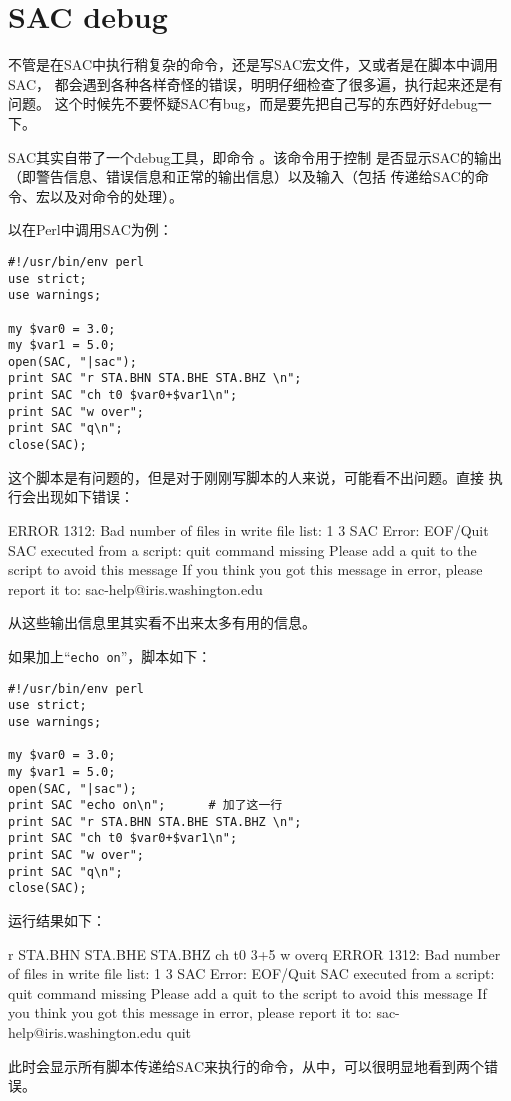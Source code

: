 \section{SAC debug}
不管是在SAC中执行稍复杂的命令，还是写SAC宏文件，又或者是在脚本中调用SAC，
都会遇到各种各样奇怪的错误，明明仔细检查了很多遍，执行起来还是有问题。
这个时候先不要怀疑SAC有bug，而是要先把自己写的东西好好debug一下。

SAC其实自带了一个debug工具，即命令 。该命令用于控制
是否显示SAC的输出（即警告信息、错误信息和正常的输出信息）以及输入（包括
传递给SAC的命令、宏以及对命令的处理）。

以在Perl中调用SAC为例：
\begin{verbatim}
#!/usr/bin/env perl
use strict;
use warnings;

my $var0 = 3.0;
my $var1 = 5.0;
open(SAC, "|sac");
print SAC "r STA.BHN STA.BHE STA.BHZ \n";
print SAC "ch t0 $var0+$var1\n";
print SAC "w over";
print SAC "q\n";
close(SAC);
\end{verbatim}

这个脚本是有问题的，但是对于刚刚写脚本的人来说，可能看不出问题。直接
执行会出现如下错误：
\begin{SACCode}
 ERROR 1312: Bad number of files in write file list: 1 3
SAC Error: EOF/Quit
     SAC executed from a script: quit command missing
     Please add a quit to the script to avoid this message
     If you think you got this message in error,
     please report it to: sac-help@iris.washington.edu
\end{SACCode}
从这些输出信息里其实看不出来太多有用的信息。

如果加上``\texttt{echo on}''，脚本如下：
\begin{verbatim}
#!/usr/bin/env perl
use strict;
use warnings;

my $var0 = 3.0;
my $var1 = 5.0;
open(SAC, "|sac");
print SAC "echo on\n";      # 加了这一行
print SAC "r STA.BHN STA.BHE STA.BHZ \n";
print SAC "ch t0 $var0+$var1\n";
print SAC "w over";
print SAC "q\n";
close(SAC);
\end{verbatim}

运行结果如下：
\begin{SACCode}
 r STA.BHN STA.BHE STA.BHZ
 ch t0 3+5
 w overq
 ERROR 1312: Bad number of files in write file list: 1 3
SAC Error: EOF/Quit
     SAC executed from a script: quit command missing
     Please add a quit to the script to avoid this message
     If you think you got this message in error,
     please report it to: sac-help@iris.washington.edu
 quit
\end{SACCode}
此时会显示所有脚本传递给SAC来执行的命令，从中，可以很明显地看到两个错误。

